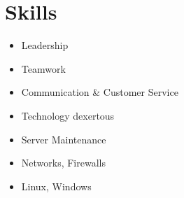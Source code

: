 \section{Skills}
\begin{itemize}
    \item Leadership
    \item Teamwork
    \item Communication \& Customer Service
    \item Technology dexertous
    \item Server Maintenance
    \item Networks, Firewalls
    \item Linux, Windows
\end{itemize}
